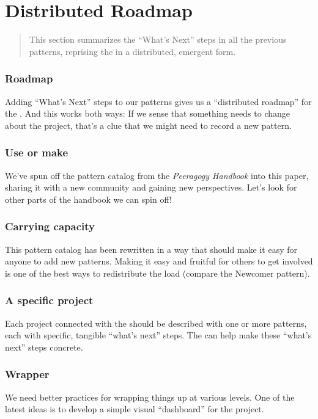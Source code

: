 \section{Distributed Roadmap} \label{sec:Distributed_Roadmap}

\begin{quote}
This section summarizes the ``What's Next'' steps in all the previous
patterns, reprising the  in a distributed, emergent form.
\end{quote}

\subsubsection*{Roadmap} Adding ``What's Next'' steps to our patterns gives us a ``distributed roadmap'' for the .  And this works both ways:  
If we sense that something needs to change about the project, that's a
clue that we might need to record a new pattern.

\subsubsection*{Use or make} 
We've spun off the pattern catalog from the \emph{Peeragogy Handbook} into this paper, sharing it with a new community and gaining new perspectives.  Let's look for other parts of the handbook we can spin off!

\subsubsection*{Carrying capacity} This pattern catalog has been rewritten in a way that should make it
easy for anyone to add new patterns. Making it easy and fruitful for
others to get involved is one of the best ways to redistribute the load
(compare the Newcomer pattern).

\subsubsection*{A specific project} 
 Each project connected with the  should be described with one or more patterns, each with specific, tangible ``what's next'' steps.  The  can help make these ``what's next'' steps concrete.

\subsubsection*{Wrapper}  We need better practices for wrapping things up at
various levels.  One of the latest ideas is to develop a simple visual
``dashboard'' for the project.

